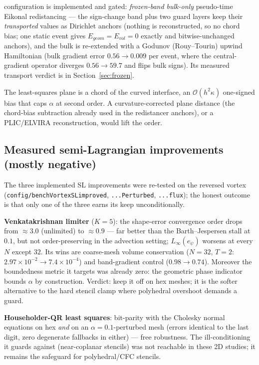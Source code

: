 \documentclass[preprint,3p,11pt]{elsarticle}
\begin{document}
\begin{description}
    configuration is implemented and gated: \emph{frozen-band bulk-only}
    pseudo-time Eikonal redistancing --- the sign-change band plus two guard
    layers keep their \emph{transported} values as Dirichlet anchors (nothing
    is reconstructed, so no chord bias; one static event gives $E_{geom} =
    E_{vol} = 0$ exactly and bitwise-unchanged anchors), and the bulk is
    re-extended with a Godunov (Rouy--Tourin) upwind Hamiltonian (bulk
    gradient error $0.56 \to 0.009$ per event, where the central-gradient
    operator diverges $0.56 \to 59.7$ and flips bulk signs). Its measured
    transport verdict is in Section~\ref{sec:frozen}.
  \item[Phase indicator (shared)] The least-squares plane is a chord of the
    curved interface, an $\mathcal{O}(h^2\kappa)$ one-signed bias that caps
    $\alpha$ at second order. A curvature-corrected plane distance (the
    chord-bias subtraction already used in the redistancer anchors), or a
    PLIC/ELVIRA reconstruction, would lift the order.
\end{description}

\subsection{Measured semi-Lagrangian improvements (mostly negative)}
\label{sec:slimp}
The three implemented SL improvements were re-tested on the reversed vortex
(\texttt{config/benchVortexSLimproved}, \texttt{...Perturbed}, \texttt{...flux});
the honest outcome is that only one of the three earns its keep unconditionally.

\textbf{Venkatakrishnan limiter} ($K = 5$): the shape-error convergence order
drops from $\approx 3.0$ (unlimited) to $\approx 0.9$ --- far better than the
Barth--Jespersen stall at $0.1$, but not order-preserving in the advection
setting; $L_\infty(e_\psi)$ worsens at every $N$ except $32$. Its wins are
coarse-mesh volume conservation ($N{=}32$, $T{=}2$: $2.97\times10^{-2} \to
7.4\times10^{-4}$) and band-gradient control ($0.98 \to 0.74$). Moreover the
boundedness metric it targets was already zero: the geometric phase indicator
bounds $\alpha$ by construction. Verdict: keep it off on hex meshes; it is the
softer alternative to the hard stencil clamp where polyhedral overshoot demands
a guard.

\textbf{Householder-QR least squares}: bit-parity with the Cholesky normal
equations on hex \emph{and} on an $\alpha{=}0.1$-perturbed mesh (errors
identical to the last digit, zero degenerate fallbacks in either) --- free
robustness. The ill-conditioning it guards against (near-coplanar stencils)
was not reachable in these 2D studies; it remains the safeguard for
polyhedral/CFC stencils.
\end{document}
